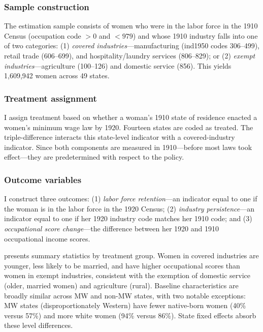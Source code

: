 \documentclass[12pt]{article}
\begin{document}
\subsubsection*{Sample construction} The estimation sample consists of women who were in the labor force in the 1910 Census (occupation code $> 0$ and $< 979$) and whose 1910 industry falls into one of two categories: (1) \textit{covered industries}---manufacturing (ind1950 codes 306--499), retail trade (606--699), and hospitality/laundry services (806--829); or (2) \textit{exempt industries}---agriculture (100--126) and domestic service (856). This yields 1,609,942 women across 49 states.

\subsubsection*{Treatment assignment} I assign treatment based on whether a woman's 1910 state of residence enacted a women's minimum wage law by 1920. Fourteen states are coded as treated. The triple-difference interacts this state-level indicator with a covered-industry indicator. Since both components are measured in 1910---before most laws took effect---they are predetermined with respect to the policy.

\subsubsection*{Outcome variables} I construct three outcomes: (1) \textit{labor force retention}---an indicator equal to one if the woman is in the labor force in the 1920 Census; (2) \textit{industry persistence}---an indicator equal to one if her 1920 industry code matches her 1910 code; and (3) \textit{occupational score change}---the difference between her 1920 and 1910 occupational income scores.

 presents summary statistics by treatment group. Women in covered industries are younger, less likely to be married, and have higher occupational scores than women in exempt industries, consistent with the exemption of domestic service (older, married women) and agriculture (rural). Baseline characteristics are broadly similar across MW and non-MW states, with two notable exceptions: MW states (disproportionately Western) have fewer native-born women (40\% versus 57\%) and more white women (94\% versus 86\%). State fixed effects absorb these level differences.


\end{document}
